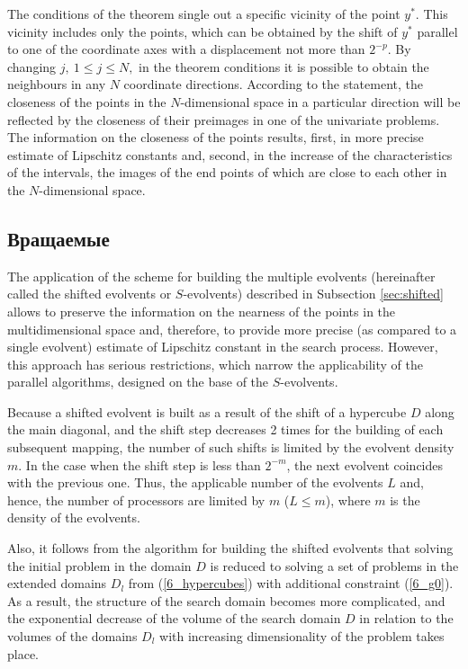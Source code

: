 \documentclass[runningheads]{llncs}
\begin{document}
The conditions of the theorem single out a specific vicinity of the point $y^\ast$. This vicinity includes only the points, which can be obtained by the shift of $y^\ast$ parallel to one of the coordinate axes with a displacement not more than $2^{-p}$. By changing  $j,\ 1\leq j\leq N,$ in the theorem conditions it is possible to obtain the neighbours in any $N$ coordinate directions. According to the statement, the closeness of the points in the $N$-dimensional space in a particular direction will be reflected by the closeness of their preimages in one of the univariate problems. The information on the closeness of the points results, first, in more precise estimate of Lipschitz constants and, second, in the increase of the characteristics of the intervals, the images of the end points of which are close to each other in the $N$-dimensional space.


\subsection{Вращаемые}
The application of the scheme for building the multiple evolvents (hereinafter called the shifted evolvents or $S$-evolvents) described in Subsection \ref{sec:shifted} allows to preserve the information on the nearness of the points in the multidimensional space and, therefore, to provide more precise (as compared to a single evolvent) estimate of Lipschitz constant in the search process. However, this approach has serious restrictions, which narrow the applicability of the parallel algorithms, designed on the base of the $S$-evolvents.

Because a shifted evolvent is built as a result of the shift of a hypercube $D$ along the main diagonal, and the shift step decreases 2 times for the building of each subsequent mapping, the number of such shifts is limited by the evolvent density $m$. In the case when the shift step is less than $2^{-m}$, the next evolvent coincides with the previous one. Thus, the applicable number of the evolvents $L$ and, hence, the number of processors are limited by $m$ ($L\leq m$), where $m$ is the density of the evolvents.

Also, it follows from the algorithm for building the shifted evolvents that solving the initial problem in the domain $D$ is reduced to solving a set of problems in the extended domains $D_l$ from (\ref{6_hypercubes}) with additional constraint (\ref{6_g0}). As a result, the structure of the search domain becomes more complicated, and the exponential decrease of the volume of the search domain $D$ in relation to the volumes of the domains $D_l$ with increasing dimensionality of the problem takes place.
\end{document}
